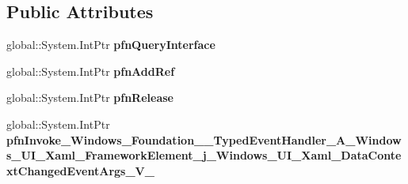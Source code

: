 \subsection*{Public Attributes}
\begin{DoxyCompactItemize}
\item 
\mbox{\label{struct_windows_1_1_foundation_1_1_typed_event_handler___a___windows___u_i___xaml___framework_ele0f0aa82fcf85c345ad8a6f22953a8130_a71506179610869b4510c57fb698666a7}} 
global\+::\+System.\+Int\+Ptr {\bfseries pfn\+Query\+Interface}
\item 
\mbox{\label{struct_windows_1_1_foundation_1_1_typed_event_handler___a___windows___u_i___xaml___framework_ele0f0aa82fcf85c345ad8a6f22953a8130_a5341d930ae5dde6c87645abfc7a6e1a7}} 
global\+::\+System.\+Int\+Ptr {\bfseries pfn\+Add\+Ref}
\item 
\mbox{\label{struct_windows_1_1_foundation_1_1_typed_event_handler___a___windows___u_i___xaml___framework_ele0f0aa82fcf85c345ad8a6f22953a8130_ac003edda6e0c964b75c3f605c61ae57f}} 
global\+::\+System.\+Int\+Ptr {\bfseries pfn\+Release}
\item 
\mbox{\label{struct_windows_1_1_foundation_1_1_typed_event_handler___a___windows___u_i___xaml___framework_ele0f0aa82fcf85c345ad8a6f22953a8130_a38b657fff7e1dae1f30a361bd381b92d}} 
global\+::\+System.\+Int\+Ptr {\bfseries pfn\+Invoke\+\_\+\+Windows\+\_\+\+Foundation\+\_\+\+\_\+\+Typed\+Event\+Handler\+\_\+\+A\+\_\+\+Windows\+\_\+\+U\+I\+\_\+\+Xaml\+\_\+\+Framework\+Element\+\_\+j\+\_\+\+Windows\+\_\+\+U\+I\+\_\+\+Xaml\+\_\+\+Data\+Context\+Changed\+Event\+Args\+\_\+\+V\+\_\+}
\end{DoxyCompactItemize}
